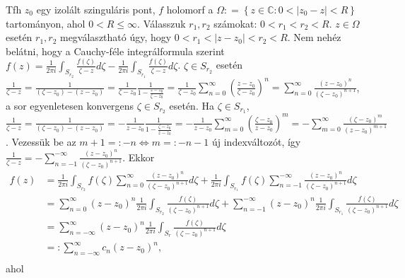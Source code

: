 \documentclass[12pt,a4paper]{scrartcl}
\begin{document}
Tfh \(z_{0}\) egy izolált szinguláris pont, \(f\) holomorf a
\(\Omega: = \left\{ {z \in {\mathbb{C}}:0 < \left| {z_{0} - z} \right| < R} \right\}\)
tartományon, ahol \(0 < R \leq \infty\). Válasszuk \(r_{1},r_{2}\)
számokat: \(0 < r_{1} < r_{2} < R\). \(z \in \Omega\) esetén
\(r_{1},r_{2}\) megválasztható úgy, hogy
\(0 < r_{1} < \left| {z - z_{0}} \right| < r_{2} < R\). Nem nehéz
belátni, hogy a Cauchy-féle integrálformula szerint
\(f\left( z \right) = \frac{1}{2\pi i}{\int_{S_{r_{2}}}{\frac{f\left( \zeta \right)}{\zeta - z}d\zeta}} - \frac{1}{2\pi i}{\int_{S_{r_{1}}}{\frac{f\left( \zeta \right)}{\zeta - z}d\zeta}}\).
\(\zeta \in S_{r_{2}}\) esetén
\(\frac{1}{\zeta - z} = \frac{1}{\left( {\zeta - z_{0}} \right) - \left( {z - z_{0}} \right)} = \frac{1}{\zeta - z_{0}}\frac{1}{1 - \frac{z - z_{0}}{\zeta - z_{0}}} = \frac{1}{\zeta - z_{0}}{\sum\limits_{n = 0}^{\infty}\left( \frac{z - z_{0}}{\zeta - z_{0}} \right)^{n}} = {\sum\limits_{n = 0}^{\infty}\frac{\left( {z - z_{0}} \right)^{n}}{\left( {\zeta - z_{0}} \right)^{n + 1}}}\),
a sor egyenletesen konvergens \(\zeta \in S_{r_{2}}\) esetén. Ha
\(\zeta \in S_{r_{1}}\),
\(\frac{1}{\zeta - z} = \frac{1}{\left( {\zeta - z_{0}} \right) - \left( {z - z_{0}} \right)} = - \frac{1}{z - z_{0}}\frac{1}{1 - \frac{\zeta - z_{0}}{z - z_{0}}} = - \frac{1}{z - z_{0}}{\sum\limits_{m = 0}^{\infty}{\left( \frac{\zeta - z_{0}}{z - z_{0}} \right)^{m} = - {\sum\limits_{m = 0}^{\infty}\frac{\left( {\zeta - z_{0}} \right)^{m}}{\left( {z - z_{0}} \right)^{m + 1}}}}}\).
Vezessük be az
\(\left. m + 1 = : - n\Leftrightarrow m = : - n - 1 \right.\) új
indexváltozót, így
\(\frac{1}{\zeta - z} = - {\sum\limits_{n = - 1}^{- \infty}\frac{\left( {z - z_{0}} \right)^{n}}{\left( {\zeta - z_{0}} \right)^{n + 1}}}\).
Ekkor \[\begin{aligned}
  f\left( z \right) &  = \frac{1}{{2\pi i}}\int_{{S_{{r_2}}}} {f\left( \zeta  \right)\mathop \sum \limits_{n = 0}^\infty  \frac{{{{\left( {z - {z_0}} \right)}^n}}}{{{{\left( {\zeta  - {z_0}} \right)}^{n + 1}}}}d\zeta }  + \frac{1}{{2\pi i}}\int_{{S_{{r_1}}}} {f\left( \zeta  \right)\mathop \sum \limits_{n =  - 1}^{ - \infty } \frac{{{{\left( {z - {z_0}} \right)}^n}}}{{{{\left( {\zeta  - {z_0}} \right)}^{n + 1}}}}d\zeta }  \\ 
   &  = \mathop \sum \limits_{n = 0}^\infty  {\left( {z - {z_0}} \right)^n}\frac{1}{{2\pi i}}\int_{{S_{{r_2}}}} {\frac{{f\left( \zeta  \right)}}{{{{\left( {\zeta  - {z_0}} \right)}^{n + 1}}}}d\zeta }  + \mathop \sum \limits_{n =  - 1}^{ - \infty } {\left( {z - {z_0}} \right)^n}\frac{1}{{2\pi i}}\int_{{S_{{r_1}}}} {\frac{{f\left( \zeta  \right)}}{{{{\left( {\zeta  - {z_0}} \right)}^{n + 1}}}}d\zeta }  \\ 
   &  = \mathop \sum \limits_{n =  - \infty }^\infty  {\left( {z - {z_0}} \right)^n}\frac{1}{{2\pi i}}\int_{{S_r}} {\frac{{f\left( \zeta  \right)}}{{{{\left( {\zeta  - {z_0}} \right)}^{n + 1}}}}d\zeta }  \\ 
   &  = :\mathop \sum \limits_{n =  - \infty }^\infty  {c_n}{\left( {z - {z_0}} \right)^n} ,\\ 
\end{aligned} \] ahol
\end{document}
